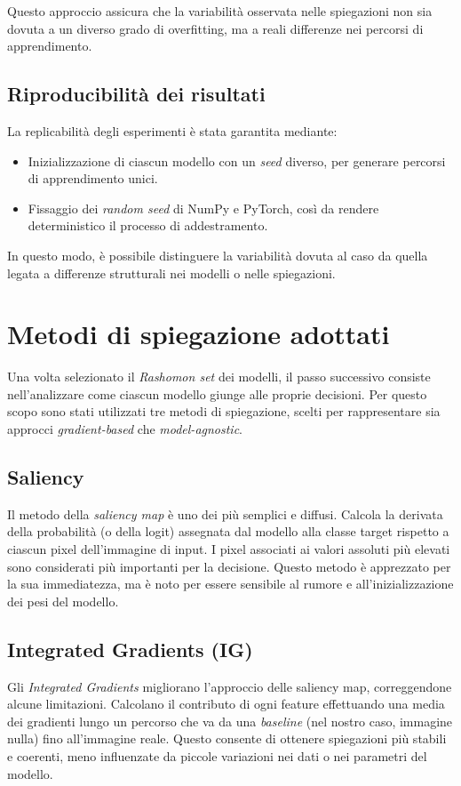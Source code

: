 \documentclass{article}
\begin{document}
Questo approccio assicura che la variabilità osservata nelle spiegazioni non
sia dovuta a un diverso grado di overfitting, ma a reali differenze nei
percorsi di apprendimento.

\subsection{Riproducibilità dei risultati}
La replicabilità degli esperimenti è stata garantita mediante:
\begin{itemize}
      \item Inizializzazione di ciascun modello con un \emph{seed} diverso, per generare
            percorsi di apprendimento unici.
      \item Fissaggio dei \emph{random seed} di NumPy e PyTorch, così da rendere
            deterministico il processo di addestramento.
\end{itemize}

In questo modo, è possibile distinguere la variabilità dovuta al caso da quella
legata a differenze strutturali nei modelli o nelle spiegazioni.

\section{Metodi di spiegazione adottati}

Una volta selezionato il \emph{Rashomon set} dei modelli, il passo successivo
consiste nell’analizzare come ciascun modello giunge alle proprie decisioni.
Per questo scopo sono stati utilizzati tre metodi di spiegazione, scelti per
rappresentare sia approcci \emph{gradient-based} che \emph{model-agnostic}.

\subsection{Saliency}
Il metodo della \emph{saliency map} è uno dei più semplici e diffusi. Calcola
la derivata della probabilità (o della logit) assegnata dal modello alla classe
target rispetto a ciascun pixel dell’immagine di input. I pixel associati ai
valori assoluti più elevati sono considerati più importanti per la decisione.
Questo metodo è apprezzato per la sua immediatezza, ma è noto per essere
sensibile al rumore e all’inizializzazione dei pesi del modello.

\subsection{Integrated Gradients (IG)}
Gli \emph{Integrated Gradients} migliorano l’approccio delle saliency map,
correggendone alcune limitazioni. Calcolano il contributo di ogni feature
effettuando una media dei gradienti lungo un percorso che va da una
\emph{baseline} (nel nostro caso, immagine nulla) fino all’immagine reale.
Questo consente di ottenere spiegazioni più stabili e coerenti, meno
influenzate da piccole variazioni nei dati o nei parametri del modello.
\end{document}
